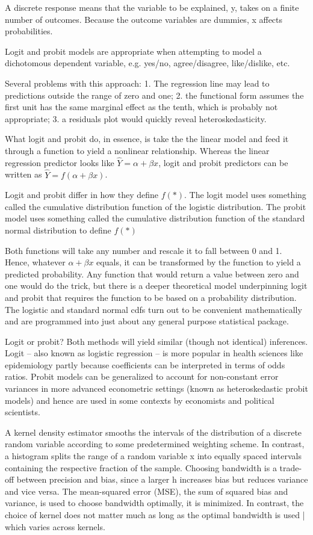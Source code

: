 \documentclass[7pt, a4paper]{article}
\begin{document}
\begin{multicols*}{3}
A discrete response means that the variable to be explained, y, takes on a finite number of outcomes. Because the outcome variables are dummies, x affects
probabilities.

Logit and probit models are appropriate when attempting to model a dichotomous dependent variable, e.g. yes/no, agree/disagree, like/dislike, etc.

Several problems with this approach: 1. The regression line may lead to predictions outside the range of zero and one; 2. the functional form assumes the first unit has the same marginal effect as the tenth, which is probably not appropriate; 3. a residuals plot would quickly reveal heteroskedasticity.

What logit and probit do, in essence, is take the the linear model and feed it through a function to yield a nonlinear relationship. Whereas the linear regression predictor looks like $\hat{Y}=\alpha + \beta x$, logit and probit predictors can be written as $\hat{Y}=f(\alpha + \beta x)$.

Logit and probit differ in how they define $f(*)$. The logit model uses something called the cumulative distribution function of the logistic distribution. The probit model uses something called the cumulative distribution function of the standard normal distribution to define $f(*)$

Both functions will take any number and rescale it to fall between 0 and 1. Hence, whatever $\alpha + \beta x$ equals, it can be transformed by the function to yield a predicted probability. Any function that would return a value between zero and one would do the trick, but there is a deeper theoretical model underpinning logit and probit that requires the function to be based on a probability distribution. The logistic and standard normal cdfs turn out to be convenient mathematically and are programmed into just about any general purpose statistical package.

Logit or probit? Both methods will yield similar (though not identical) inferences. Logit – also known as logistic regression – is more popular in health sciences like epidemiology partly because coefficients can be interpreted in terms of odds ratios. Probit models can be generalized to account for non-constant error variances in more advanced econometric settings (known as heteroskedastic probit models) and hence are used in some contexts by economists and political scientists.

A kernel density estimator smooths the intervals of the distribution of a discrete random variable according to some predetermined weighting scheme. In contrast, a histogram splits the range of a random variable x into equally spaced intervals containing the respective fraction of the sample. Choosing bandwidth is a trade-off between precision and bias, since a larger h increases bias but reduces variance and vice versa. The mean-squared error (MSE), the sum of squared bias and variance, is used
to choose bandwidth optimally, it is minimized. In contrast, the choice of kernel does not matter much as long as the optimal bandwidth is used | which varies across kernels.


\end{multicols*}
\end{document}
